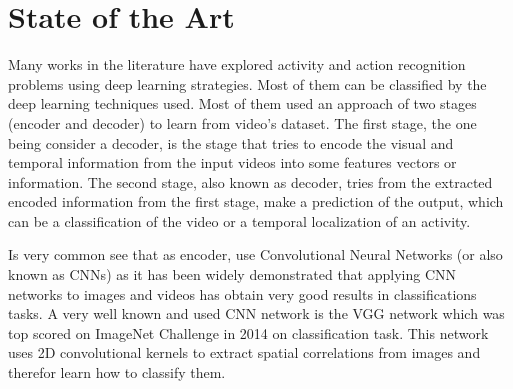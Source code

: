 \chapter{State of the Art}




Many works in the literature have explored activity and action recognition problems using deep learning strategies. Most of them can be classified by the deep learning techniques used. Most of them used an approach of two stages (encoder and decoder) to learn from video's dataset. The first stage, the one being consider a decoder, is the stage that tries to encode the visual and temporal information from the input videos into some features vectors or information. The second stage, also known as decoder, tries from the extracted encoded information from the first stage, make a prediction of the output, which can be a classification of the video or a temporal localization of an activity.

Is very common see that as encoder, use Convolutional Neural Networks (or also known as CNNs) as it has been widely demonstrated that applying CNN networks to images and videos has obtain very good results in classifications tasks. A very well known and used CNN network is the VGG\cite{Simonyan14c} network which was top scored on ImageNet Challenge in 2014 on classification task. This network uses 2D convolutional kernels to extract spatial correlations from images and therefor learn how to classify them. 

